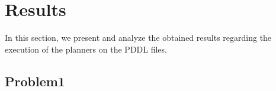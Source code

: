 \section{Results}
\label{sec4}
In this section, we present and analyze the obtained results regarding the execution of the planners on 
the PDDL files.

\subsection{Problem1}

